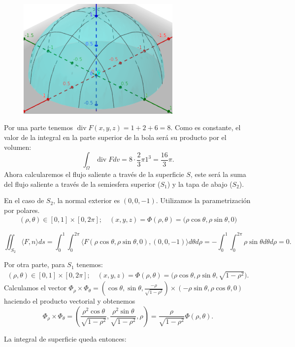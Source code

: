 \documentclass[12pt,spanish]{article}
\theoremstyle{definition}
\theoremstyle{remark}
\begin{document}
\begin{figure}[H]
	\centering
	\includegraphics[width=80mm]{images/superficie-ejemplo-divergencia}
\end{figure}

Por una parte tenemos $\operatorname{div}F(x,y,z)=1+2+6=8$. Como es constante, el valor de la integral en la parte superior de la bola será su producto por el volumen:
\[\int_\Omega\operatorname{div}F dv=8\cdot \frac{2}{3}\pi 1^3=\frac{16}{3}\pi.\]
Ahora calcularemos el flujo saliente a través de la superficie $S$, este será la suma del flujo saliente a través de la semiesfera superior ($S_1$) y la tapa de abajo ($S_2$).

En el caso de $S_2$, la normal exterior es $(0,0,-1)$. Utilizamos la parametrización por polares.
\begin{gather*}
(\rho,\theta)\in[0,1]\times[0,2\pi];\quad (x,y,z)=\Phi(\rho,\theta)=\big(\rho\cos \theta, \rho\sin\theta, 0\big)
\end{gather*}

\[\iint_{S_2}\langle F,n\rangle ds=\int_0^1\int_0^{2\pi}\langle F(\rho \cos\theta, \rho \sin\theta,0),(0,0,-1)\rangle d\theta d\rho=-\int_0^1\int_0^{2\pi}\rho\sin\theta d\theta d\rho=0.\]

Por otra parte, para $S_1$ tenemos:
\begin{gather*}
(\rho,\theta)\in[0,1]\times[0,2\pi];\quad (x,y,z)=\Phi(\rho,\theta)=\big(\rho\cos \theta, \rho\sin\theta, \sqrt{1-\rho^2}\big).
\end{gather*}
Calculamos el vector $\Phi_\rho\times \Phi_\theta=\left(\cos\theta,\sin\theta,\frac{-\rho}{\sqrt{1-\rho^2}}\right)\times (-\rho\sin\theta,\rho\cos\theta,0)$ haciendo el producto vectorial y obtenemos
\[\Phi_\rho\times \Phi_\theta=\left(\frac{\rho^2\cos\theta}{\sqrt{1-\rho^2}},\frac{\rho^2\sin\theta}{\sqrt{1-\rho^2}},\rho\right)=\frac{\rho}{\sqrt{1-\rho^2}}\Phi(\rho,\theta).\]

La integral de superficie queda entonces:
\end{document}
